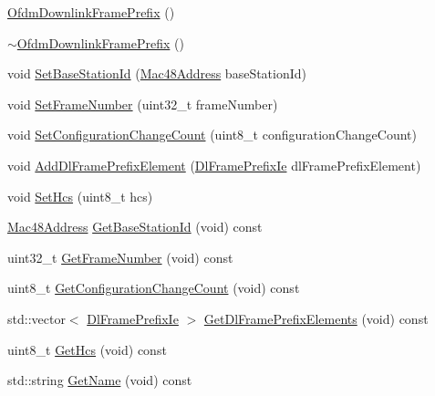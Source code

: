 \begin{DoxyCompactItemize}
\item 
\hyperlink{classns3_1_1OfdmDownlinkFramePrefix_ae60d69adbc7b159ea8ff557d880a4268}{Ofdm\+Downlink\+Frame\+Prefix} ()
\item 
\hyperlink{classns3_1_1OfdmDownlinkFramePrefix_a0ce1591f8e4b4be163c8033bc7b44b05}{$\sim$\+Ofdm\+Downlink\+Frame\+Prefix} ()
\item 
void \hyperlink{classns3_1_1OfdmDownlinkFramePrefix_ab80ba044570c8ccd59d60a4598277914}{Set\+Base\+Station\+Id} (\hyperlink{classns3_1_1Mac48Address}{Mac48\+Address} base\+Station\+Id)
\item 
void \hyperlink{classns3_1_1OfdmDownlinkFramePrefix_a423e932c6fa33ff0ef839e4b16932077}{Set\+Frame\+Number} (uint32\+\_\+t frame\+Number)
\item 
void \hyperlink{classns3_1_1OfdmDownlinkFramePrefix_a3f520c9c7067cc88f91e535a890023da}{Set\+Configuration\+Change\+Count} (uint8\+\_\+t configuration\+Change\+Count)
\item 
void \hyperlink{classns3_1_1OfdmDownlinkFramePrefix_aa1d561299ef8d2a1e9754c6956e79764}{Add\+Dl\+Frame\+Prefix\+Element} (\hyperlink{classns3_1_1DlFramePrefixIe}{Dl\+Frame\+Prefix\+Ie} dl\+Frame\+Prefix\+Element)
\item 
void \hyperlink{classns3_1_1OfdmDownlinkFramePrefix_ae8924183a120a04c2bb0c0dcbc0918c2}{Set\+Hcs} (uint8\+\_\+t hcs)
\item 
\hyperlink{classns3_1_1Mac48Address}{Mac48\+Address} \hyperlink{classns3_1_1OfdmDownlinkFramePrefix_a009c6258aab49b2a46dd513af4c1003f}{Get\+Base\+Station\+Id} (void) const 
\item 
uint32\+\_\+t \hyperlink{classns3_1_1OfdmDownlinkFramePrefix_a423bdaeee5c081c9f2e26c849ad9a934}{Get\+Frame\+Number} (void) const 
\item 
uint8\+\_\+t \hyperlink{classns3_1_1OfdmDownlinkFramePrefix_a53c74c02db26cadc009b73a7eafb45ea}{Get\+Configuration\+Change\+Count} (void) const 
\item 
std\+::vector$<$ \hyperlink{classns3_1_1DlFramePrefixIe}{Dl\+Frame\+Prefix\+Ie} $>$ \hyperlink{classns3_1_1OfdmDownlinkFramePrefix_ab2440453f8f4b3192ce46668b832b76a}{Get\+Dl\+Frame\+Prefix\+Elements} (void) const 
\item 
uint8\+\_\+t \hyperlink{classns3_1_1OfdmDownlinkFramePrefix_a5655545e19525a32febd2a68e6a8029e}{Get\+Hcs} (void) const 
\item 
std\+::string \hyperlink{classns3_1_1OfdmDownlinkFramePrefix_aec061fb60199d672ecf9fbc2e6a9ec65}{Get\+Name} (void) const 

\end{DoxyCompactItemize}
